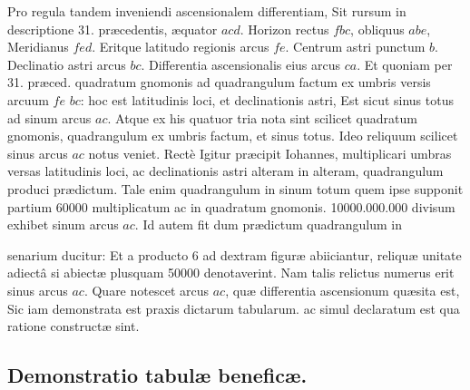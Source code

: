 \documentclass[11pt,a4paper]{article}
\begin{document}
Pro regula tandem inveniendi ascensionalem differentiam, Sit
rursum in descriptione 31. præcedentis, æquator $acd$. Horizon
rectus $fbc$, obliquus $abe$, Meridianus $fed$. Eritque latitudo
regionis arcus $fe$. Centrum astri punctum $b$. Declinatio astri
arcus $bc$. Differentia ascensionalis eius arcus $ca$. Et quoniam
per 31. præced. quadratum gnomonis ad quadrangulum
factum ex umbris versis arcuum $fe$ $bc$: hoc est latitudinis loci,
et declinationis astri, Est sicut sinus totus ad sinum arcus
$ac$. Atque ex his quatuor tria nota sint scilicet quadratum
gnomonis, quadrangulum ex umbris factum, et sinus totus.
Ideo reliquum scilicet sinus arcus $ac$ notus veniet. Rectè
Igitur præcipit Iohannes, multiplicari umbras versas latitudinis
loci, ac declinationis astri alteram in alteram, 
quadrangulum produci prædictum. Tale enim quadrangulum
in sinum totum quem ipse supponit partium 60000 multiplicatum
ac in quadratum gnomonis. 10000.000.000 divisum exhibet sinum
arcus $ac$. Id autem fit dum prædictum quadrangulum in

senarium ducitur: Et a producto 6 ad dextram figuræ abiiciantur,
reliquæ unitate adiectâ si abiectæ plusquam 50000 denotaverint.
Nam talis relictus numerus erit sinus arcus $ac$. Quare notescet
arcus $ac$, quæ differentia ascensionum quæsita est, Sic iam
demonstrata est praxis dictarum tabularum. ac simul declaratum est
qua ratione constructæ sint.

\subsection*{Demonstratio tabulæ beneficæ.}
\end{document}
